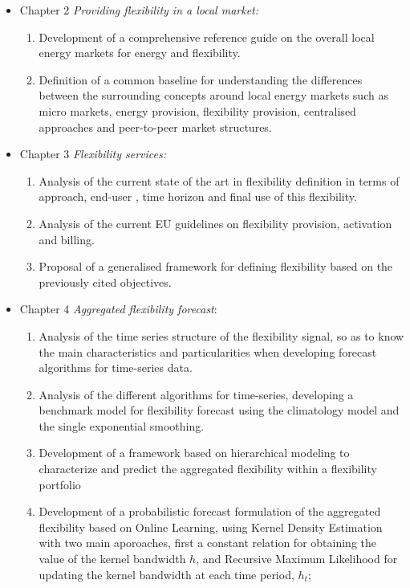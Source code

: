 \begin{itemize}
\item Chapter 2 \textit{Providing flexibility in a local market:} 
	\begin{enumerate}
		\item Development of a comprehensive reference guide on the overall local energy markets for energy and flexibility.
		\item Definition of a common baseline for understanding the differences between the surrounding concepts around local energy markets such as micro markets, energy provision, flexibility provision, centralised approaches and peer-to-peer market structures.  
	\end{enumerate}
\item Chapter 3 \textit{Flexibility services:} 
	\begin{enumerate}
		\item Analysis of the current state of the art in flexibility definition in terms of approach, end-user , time horizon and final use of this flexibility. 
		\item Analysis of the current EU guidelines on flexibility provision, activation and billing. 
		\item Proposal of a generalised framework for defining flexibility based on the previously cited objectives. 
	\end{enumerate}
\item Chapter 4 \textit{Aggregated flexibility forecast}: 
	\begin{enumerate}
		\item Analysis of the time series structure of the flexibility signal, so as to know the main characteristics and particularities when developing forecast algorithms for time-series data. 
		\item Analysis of the different algorithms for time-series, developing a benchmark model for flexibility forecast using the climatology model and the single exponential smoothing. 
		\item Development of a framework based on hierarchical modeling to characterize and predict the aggregated flexibility within a flexibility portfolio
		\item Development  of a probabilistic forecast formulation of the aggregated flexibility based on Online Learning, using Kernel Density Estimation with two main aporoaches, first a constant relation for obtaining the value of the kernel bandwidth $h$, and Recursive Maximum Likelihood for updating the kernel bandwidth at each time period, $h_t$;

\end{enumerate}
\end{itemize}
